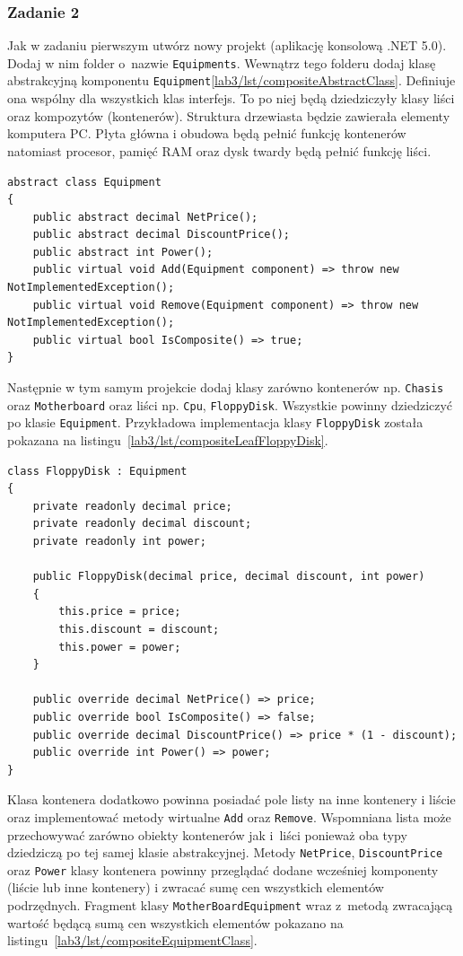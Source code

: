 \subsubsection{Zadanie 2}

Jak w zadaniu pierwszym utwórz nowy projekt (aplikację konsolową .NET 5.0). Dodaj w nim folder o~nazwie \texttt{Equipments}. Wewnątrz tego folderu dodaj klasę abstrakcyjną komponentu \texttt{Equipment}\ref{lab3/lst/compositeAbstractClass}. Definiuje ona wspólny dla wszystkich klas interfejs. To po niej będą dziedziczyły klasy liści oraz kompozytów (kontenerów). Struktura drzewiasta będzie zawierała elementy komputera PC. Płyta główna i obudowa będą pełnić funkcję kontenerów natomiast procesor, pamięć RAM oraz dysk twardy będą pełnić funkcję liści.
\begin{lstlisting}[caption={Przykład abstrakcyjnej klasy komponentu}, label={lab3/lst/compositeAbstractClass}]
abstract class Equipment
{
	public abstract decimal NetPrice();
	public abstract decimal DiscountPrice();	
	public abstract int Power();
	public virtual void Add(Equipment component) => throw new NotImplementedException();	
	public virtual void Remove(Equipment component) => throw new NotImplementedException();
	public virtual bool IsComposite() => true;
}
\end{lstlisting}
Następnie w tym samym projekcie dodaj klasy zarówno kontenerów np. \texttt{Chasis} oraz \texttt{Motherboard} oraz liści np. \texttt{Cpu}, \texttt{FloppyDisk}. Wszystkie powinny dziedziczyć po klasie \texttt{Equipment}. Przykładowa implementacja klasy \texttt{FloppyDisk} została pokazana na listingu~\ref{lab3/lst/compositeLeafFloppyDisk}.
\begin{lstlisting}[caption={Przykład klasy będącej liściem kompozytu}, label={lab3/lst/compositeLeafFloppyDisk}]
class FloppyDisk : Equipment
{
	private readonly decimal price;
	private readonly decimal discount;
	private readonly int power;
	
	public FloppyDisk(decimal price, decimal discount, int power)
	{
		this.price = price;
		this.discount = discount;
		this.power = power;
	}

	public override decimal NetPrice() => price;	
	public override bool IsComposite() => false;	
	public override decimal DiscountPrice() => price * (1 - discount);
	public override int Power() => power;
}
\end{lstlisting}
Klasa kontenera dodatkowo powinna posiadać pole listy na inne kontenery i liście oraz implementować metody wirtualne \texttt{Add} oraz \texttt{Remove}. Wspomniana lista może przechowywać zarówno obiekty kontenerów jak i~liści ponieważ oba typy dziedziczą po tej samej klasie abstrakcyjnej. Metody \texttt{NetPrice}, \texttt{DiscountPrice} oraz \texttt{Power} klasy kontenera powinny przeglądać dodane wcześniej komponenty (liście lub inne kontenery) i zwracać sumę cen wszystkich elementów podrzędnych. Fragment klasy \texttt{MotherBoardEquipment} wraz z~metodą zwracającą wartość będącą sumą cen wszystkich elementów pokazano na listingu~\ref{lab3/lst/compositeEquipmentClass}.
